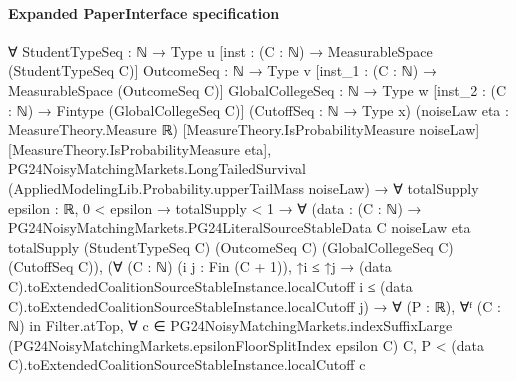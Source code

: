 \documentclass[10pt]{article}
\begin{document}
\paragraph{Expanded PaperInterface specification}
\begin{ReviewVerbatim}
∀ {StudentTypeSeq : ℕ → Type u} [inst : (C : ℕ) → MeasurableSpace (StudentTypeSeq C)] {OutcomeSeq : ℕ → Type v}
  [inst_1 : (C : ℕ) → MeasurableSpace (OutcomeSeq C)] {GlobalCollegeSeq : ℕ → Type w}
  [inst_2 : (C : ℕ) → Fintype (GlobalCollegeSeq C)] (CutoffSeq : ℕ → Type x) (noiseLaw eta : MeasureTheory.Measure ℝ)
  [MeasureTheory.IsProbabilityMeasure noiseLaw] [MeasureTheory.IsProbabilityMeasure eta],
  PG24NoisyMatchingMarkets.LongTailedSurvival (AppliedModelingLib.Probability.upperTailMass noiseLaw) →
    ∀ {totalSupply epsilon : ℝ},
      0 < epsilon →
        totalSupply < 1 →
          ∀
            (data :
              (C : ℕ) →
                PG24NoisyMatchingMarkets.PG24LiteralSourceStableData C noiseLaw eta totalSupply (StudentTypeSeq C)
                  (OutcomeSeq C) (GlobalCollegeSeq C) (CutoffSeq C)),
            (∀ (C : ℕ) (i j : Fin (C + 1)),
                ↑i ≤ ↑j →
                  (data C).toExtendedCoalitionSourceStableInstance.localCutoff i ≤
                    (data C).toExtendedCoalitionSourceStableInstance.localCutoff j) →
              ∀ (P : ℝ),
                ∀ᶠ (C : ℕ) in Filter.atTop,
                  ∀
                    c ∈
                      PG24NoisyMatchingMarkets.indexSuffixLarge
                        (PG24NoisyMatchingMarkets.epsilonFloorSplitIndex epsilon C) C,
                    P < (data C).toExtendedCoalitionSourceStableInstance.localCutoff c
\end{ReviewVerbatim}
\end{document}
